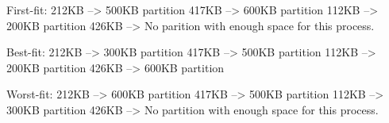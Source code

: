 \documentclass[letterpaper, 10pt,DIV=13]{scrartcl}
\numberwithin{equation}{section} %
\numberwithin{figure}{section} %
\numberwithin{table}{section} %
\begin{document}
First-fit:
\linebreak
	212KB --> 500KB partition
\linebreak
	417KB --> 600KB partition
\linebreak
	112KB --> 200KB partition
\linebreak
	426KB --> No parition with enough space for this process.
\linebreak

Best-fit:
\linebreak
	212KB --> 300KB partition
\linebreak
	417KB --> 500KB partition
\linebreak
	112KB --> 200KB partition
\linebreak
	426KB --> 600KB partition
\linebreak

Worst-fit:
\linebreak
	212KB --> 600KB partition
\linebreak
	417KB --> 500KB partition
\linebreak
	112KB --> 300KB partition
\linebreak
	426KB --> No partition with enough space for this process.
\linebreak
	
	
\end{document}
